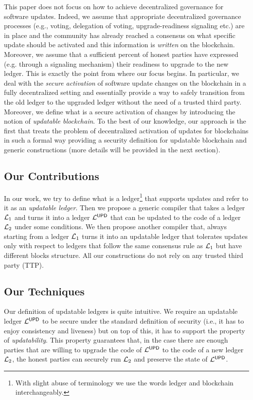 This paper does not focus on how to achieve decentralized governance for 
software updates. Indeed, we assume that appropriate decentralized governance processes (e.g., voting, 
delegation of voting, upgrade-readiness signaling etc.) are in place and the 
community has already reached a consensus on what specific update should be activated and this information is \emph{written} on the blockchain. Moreover, we assume that 
a sufficient percent of honest parties have expressed (e.g. through a signaling 
mechanism) their readiness to upgrade to the new ledger. This is exactly the 
point from where our focus begins. In particular, we deal with the \emph{secure 
activation} of software update changes on the blockchain in a fully 
decentralized setting and essentially 
provide a way to safely transition from the old ledger to the upgraded ledger 
without the need of a trusted third party. Moreover, we define what is a secure 
activation of changes by introducing the notion of \emph{updatable blockchain}. 
To the best of our knowledge, our approach is the first that treats the problem 
of decentralized activation of updates for blockchains in such a formal way 
providing a security definition for updatable blockchain and generic 
constructions (more details will be provided in the next section).


\subsection{Our Contributions}
In our work, we try to define what is a ledger\footnote{With slight abuse of terminology we use the words 
ledger and blockchain interchangeably.} that supports updates and refer to it as an \emph{updatable ledger}.
Then we propose a generic compiler that takes a ledger $\mathcal{L}_1$ and turns it into a ledger $\mathcal{L}^\mathsf{UPD}$
that can be updated to the code of a ledger $\mathcal{L}_2$ under some conditions.
We then propose another compiler that, always starting from a ledger $\mathcal{L}_1$ turns it into an updatable ledger that tolerates updates only with respect to ledgers that follow the same consensus rule as $\mathcal{L}_1$ but have different blocks structure. All our constructions do not rely on any trusted third party (TTP).

\subsection{Our Techniques} Our definition of updatable ledgers is quite intuitive. We require
an updatable ledger $\mathcal{L}^\mathsf{UPD}$ to be secure under the standard definition of security (i.e., it has to enjoy consistency and liveness) but on top of this, it has to support the property of \emph{updatability}. 
This property guarantees that, in the case there are  enough parties that are willing to upgrade 
the code of $\mathcal{L}^\mathsf{UPD}$ to the code of a new ledger $\mathcal{L}_2$, the honest parties can securely run $\mathcal{L}_2$
and preserve the state of $\mathcal{L}^\mathsf{UPD}$.

